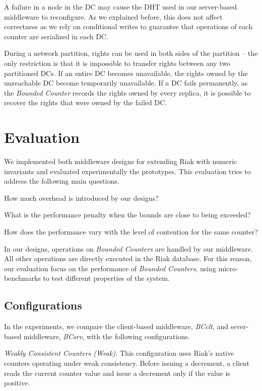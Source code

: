 \documentclass[conference]{IEEEtran}
\newcommand{\InvCounter}{\emph{Bounded Counter}}
\newcommand{\InvCounters}{\emph{Bounded Counters}}
\begin{document}
A failure in a node in the DC may cause the DHT used in our server-based
middleware to reconfigure. As we explained before, this does not affect
correctness as we rely on conditional writes to guarantee that operations
of each counter are serialized in each DC.

During a network partition, rights can be used in both sides of the partition -- the
only restriction is that it is impossible to transfer rights between
any two partitioned DCs.
If an entire DC becomes unavailable,
the rights owned by the unreachable DC become temporarily
unavailable.
If a DC fails permanently, as the \InvCounter{} records the rights owned 
by every replica, it is possible to recover the rights that were 
owned by the failed DC.



\section{Evaluation}\label{sec:eval}

We implemented both middleware designs for extending Riak with numeric invariants and evaluated experimentally the prototypes.
This evaluation tries to address the following main questions.
\begin{inparaenum}[(i)]
\item How much overhead is introduced by our designs?
\item What is the performance penalty when the bounds are close
to being exceeded? 
\item How does the performance vary with the level of contention for
the same counter?
\end{inparaenum}

In our designs, operations on \InvCounters{} are handled by our middleware. All other operations
are directly executed in the Riak database.
For this reason, our evaluation focus on the performance of \InvCounters{}, using micro-benchmarks 
to test different properties of the system.

\subsection{Configurations}

In the experiments, we compare the client-based middleware, \emph{BCclt}, and
sever-based middleware, \emph{BCsrv}, with the following 
configurations.

\emph{Weakly Consistent Counters (Weak).} 
This configuration uses Riak's native counters operating under weak consistency. 
Before issuing a decrement, a client reads the current counter value and issue 
a decrement only if the value is positive.
\end{document}
